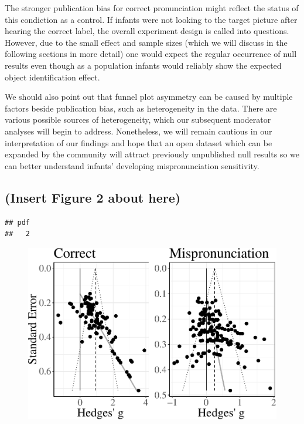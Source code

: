 \documentclass[man]{apa6}
\theoremstyle{definition}
\theoremstyle{definition}
\theoremstyle{definition}
\theoremstyle{remark}
\begin{document}
The stronger publication bias for correct pronunciation might reflect
the status of this condiction as a control. If infants were not looking
to the target picture after hearing the correct label, the overall
experiment design is called into questions. However, due to the small
effect and sample sizes (which we will discuss in the following sections
in more detail) one would expect the regular occurrence of null results
even though as a population infants would reliably show the expected
object identification effect.

We should also point out that funnel plot asymmetry can be caused by
multiple factors beside publication bias, such as heterogeneity in the
data. There are various possible sources of heterogeneity, which our
subsequent moderator analyses will begin to address. Nonetheless, we
will remain cautious in our interpretation of our findings and hope that
an open dataset which can be expanded by the community will attract
previously unpublished null results so we can better understand infants'
developing mispronunciation sensitivity.

\subsection{(Insert Figure 2 about
here)}\label{insert-figure-2-about-here-1}

\begin{verbatim}
## pdf 
##   2
\end{verbatim}

\begin{figure}
\centering
\includegraphics{Paper_Analyses_files/figure-latex/FunnelCombo-1.pdf}
\caption{}
\end{figure}
\end{document}
